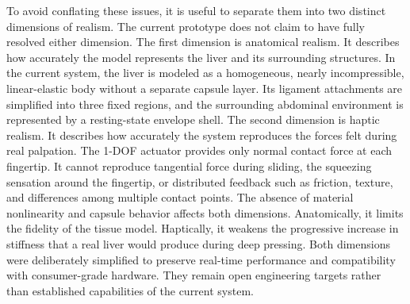 \documentclass{ieeeaccess}
\begin{document}
To avoid conflating these issues, it is useful to separate them into two distinct dimensions of realism. The current prototype does not claim to have fully resolved either dimension. The first dimension is anatomical realism. It describes how accurately the model represents the liver and its surrounding structures. In the current system, the liver is modeled as a homogeneous, nearly incompressible, linear-elastic body without a separate capsule layer. Its ligament attachments are simplified into three fixed regions, and the surrounding abdominal environment is represented by a resting-state envelope shell. The second dimension is haptic realism. It describes how accurately the system reproduces the forces felt during real palpation. The 1-DOF actuator provides only normal contact force at each fingertip. It cannot reproduce tangential force during sliding, the squeezing sensation around the fingertip, or distributed feedback such as friction, texture, and differences among multiple contact points. The absence of material nonlinearity and capsule behavior affects both dimensions. Anatomically, it limits the fidelity of the tissue model. Haptically, it weakens the progressive increase in stiffness that a real liver would produce during deep pressing. Both dimensions were deliberately simplified to preserve real-time performance and compatibility with consumer-grade hardware. They remain open engineering targets rather than established capabilities of the current system.
\end{document}
